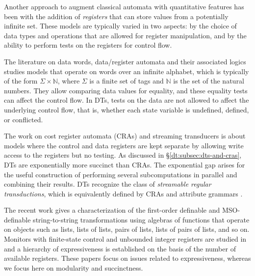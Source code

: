 Another approach to augment classical automata with quantitative features has been with the addition of \emph{registers} that can store values from a potentially infinite set. These models are typically varied in two aspects: by the choice of data types and operations that are allowed for register manipulation, and by the ability to perform tests on the registers for control flow.

The literature on data words, data/register automata and their associated logics \cite{KF1994FMA, NSV2004FSM, DL2009LFQ, BS2010NRDL, BDMSS2011LDW} studies models that operate on words over an infinite alphabet, which is typically of the form $\Sigma \times \mathbb{N}$, where $\Sigma$ is a finite set of tags and $\mathbb{N}$ is the set of the natural numbers. They allow comparing data values for equality, and these equality tests can affect the control flow.
In DTs, tests on the data are not allowed to affect the underlying control flow, that is, whether each state variable is undefined, defined, or conflicted.

The work on cost register automata (CRAs) \cite{AdADRY2013CRA, AR2013ARF} and streaming transducers \cite{AC2010SST, AC2011STA, AdA2012STT} is about models where the control and data registers are kept separate by allowing write access to the registers but no testing. As discussed in \S\ref{dt:subsec:dts-and-cras}, DTs are exponentially more succinct than CRAs. The exponential gap arises for the useful construction of performing several subcomputations in parallel and combining their results. DTs recognize the class of \emph{streamable regular transductions}, which
is equivalently defined by CRAs and attribute grammars \cite{arXiv2018}.

The recent work \cite{BDK2018} gives a characterization of the first-order definable and MSO-definable string-to-string transformations using algebras of functions that operate on objects such as lists, lists of lists, pairs of lists, lists of pairs of lists, and so on. Monitors with finite-state control and unbounded integer registers are studied in \cite{FHS2018} and a hierarchy of expressiveness is established on the basis of the number of available registers. These papers focus on issues related to expressiveness, whereas we focus here on modularity and succinctness.
